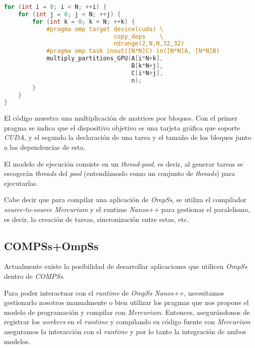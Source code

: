 \begin{lstlisting}[caption={Multiplicación de un bloque de una matriz utilizando GPUs.}, captionpos=b, label={lst:ejemplo-functions.cc}, language=C++]
for (int i = 0; i < N; ++i) {
    for (int j = 0; j < N; ++j) {
        for (int k = 0; k < N; ++k) {
            #pragma omp target device(cuda) \
                               copy_deps    \
                               ndrange(2,N,N,32,32)
            #pragma omp task inout([N*N]C) in([N*N]A, [N*N]B)
            multiply_partitions_GPU(A[i*N+k], 
                                    B[k*N+j], 
                                    C[i*N+j], 
                                    n);
        }
    }
}
\end{lstlisting}

El código muestra una multiplicación de matrices por bloques. Con el primer pragma se indica que el dispositivo objetivo es una tarjeta gráfica que soporte \textit{CUDA}, y el segundo la declaración de una tarea y el tamaño de los bloques junto a las dependencias de esta.
\par\bigskip

El modelo de ejecución consiste en un \textit{thread-pool}, es decir, al generar tareas se escogerán \textit{threads} del \textit{pool} (entendámoslo como un conjunto de \textit{threads}) para ejecutarlas.
\par\bigskip

Cabe decir que para compilar una aplicación de \textit{OmpSs}, se utiliza el compilador \textit{source-to-source Mercurium} y el runtime \textit{Nanos++} para gestionar el paralelismo, es decir, la creación de tareas, sincronización entre estas, etc.

\subsection{COMPSs+OmpSs} \label{compssompss}

Actualmente existe la posibilidad de desarrollar aplicaciones que utilicen \textit{OmpSs} dentro de \textit{COMPSs}. 
\par\bigskip
Para poder interactuar con el \textit{runtime} de \textit{OmpSs} \textit{Nanos++}, necesitamos gestionarlo nosotros manualmente o bien utilizar los pragmas que nos propone el modelo de programación y compilar con \textit{Mercurium}. Entonces, asegurándonos de registrar los \textit{workers} en el \textit{runtime} y compilando su código fuente con \textit{Mercurium} aseguramos la interacción con el \textit{runtime} y por lo tanto la integración de ambos modelos.

